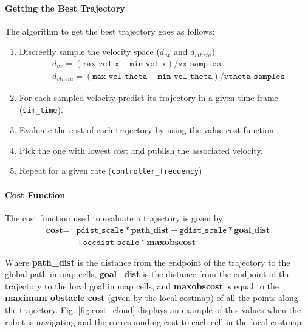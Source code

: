 \documentclass[12pt]{article}
\begin{document}
\paragraph{Getting the Best Trajectory}
The algorithm to get the best trajectory goes as follows:
\begin{enumerate}
    \item Discreetly sample the velocity space ($d_{vx}$ and $d_{vtheta}$)
    \begin{align*}
        & d_{vx}=(\texttt{max\_vel\_x}-\texttt{min\_vel\_x})/\texttt{vx\_samples}\\
         & d_{vtheta}=(\texttt{max\_vel\_theta}-\texttt{min\_vel\_theta})/\texttt{vtheta\_samples}
    \end{align*}
    \item For each sampled velocity predict its trajectory in a given time frame (\texttt{sim\_time}).
    \item Evaluate the cost of each trajectory  by using the value cost function
    \item Pick the one with lowest cost and publish the associated velocity.
    \item Repeat for a given rate (\texttt{controller\_frequency})
\end{enumerate}

\paragraph{Cost Function}
The cost function used to evaluate a trajectory is given by:
\begin{align*}
        \textbf{cost} = &
   \texttt{pdist\_scale} * \textbf{path\_dist}
   + \texttt{gdist\_scale} * \textbf{goal\_dist}\\
   &+\texttt{occdist\_scale} * \textbf{maxobscost} 
\end{align*}

Where \textbf{path\_dist} is the distance from the endpoint of the trajectory to the global path in map cells, \textbf{goal\_dist} is the distance from the endpoint of the trajectory to the local goal in map cells, and \textbf{maxobscost} is equal to the \textbf{maximum obstacle cost} (given by the local costmap) of all the points along the trajectory.
Fig. \ref{fig:cost_cloud} displays an example of this values when the robot is navigating and the corresponding cost to each cell in the local costmap.
\end{document}
